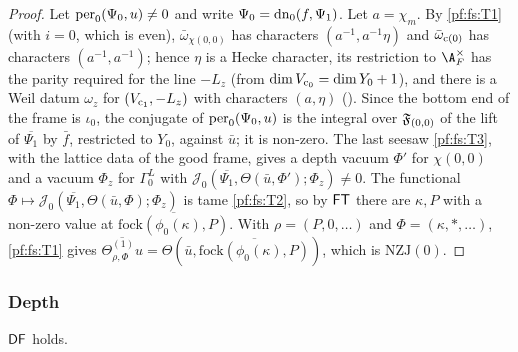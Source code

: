 \begin{proof}
Let $\mathrm{per}_0(\Psi_0,u)\ne0$ and write $\Psi_0=\mathrm{dn}_0(f,\Psi_1)$. Let $a=\chi_m$. By \ref{pf:fs:T1} (with $i=0$, which is even),
$\bar\omega_{\chi(0,0)}$ has characters $(a^{-1},a^{-1}\eta)$ and $\bar\omega_{\mathrm{c}(0)}$ has characters $(a^{-1},a^{-1})$; hence $\eta$ is a
Hecke character, its restriction to $\A_F^\times$ has the parity required for the line $-L_z$ (from $\dim V_{\mathrm{c}_0}=\dim Y_0+1$), and there is
a Weil datum $\omega_z$ for $(V_{\mathrm{c}_1},-L_z)$ with characters $(a,\eta)$ ().
Since the bottom end of the frame is $\iota_0$, the conjugate of $\mathrm{per}_0(\Psi_0,u)$ is the integral over $\mathfrak F_{(0,0)}$ of the lift of
$\overline{\Psi_1}$ by $\bar f$, restricted to $Y_0$, against $\bar u$; it is non-zero. The last seesaw \ref{pf:fs:T3}, with the lattice data
of the good frame, gives a depth vacuum $\Phi'$ for $\chi(0,0)$ and a vacuum $\Phi_z$ for $\Gamma^L_0$ with
$\mathcal J_0(\overline{\Psi_1},\Theta(\bar u,\Phi');\Phi_z)\ne0$. The functional $\Phi\mapsto\mathcal J_0(\overline{\Psi_1},\Theta(\bar u,\Phi);\Phi_z)$ is
tame \ref{pf:fs:T2}, so by $\mathsf{FT}$ there are $\kappa,P$ with a non-zero value at $\overline{\mathrm{fock}(\phi_0(\kappa),P)}$. With
$\rho=(P,0,\dots)$ and $\Phi=(\kappa,\ast,\dots)$, \ref{pf:fs:T1} gives
$\overline{\Theta^{(1)}_{\rho,\Phi}u}=\Theta(\bar u,\overline{\mathrm{fock}(\phi_0(\kappa),P)})$, which is $\mathrm{NZJ}(0)$.
\end{proof}

\subsubsection{Depth}

\begin{proposition}\label{pf:fs:depFixed}
$\mathsf{DF}$ holds.
\end{proposition}

